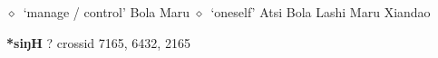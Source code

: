 \begin{list}{}{\leftmargin=1.5em \itemindent=-1.5em}
\hspace{1ex}
         $\diamond$~`manage / control'
         Bola 
\hspace{1ex}
         Maru 
\hspace{1ex}
         $\diamond$~`oneself'
         Atsi 
\hspace{1ex}
         Bola 
\hspace{1ex}
         Lashi 
\hspace{1ex}
         Maru 
\hspace{1ex}
         Xiandao 
  \end{list}
\item
\textbf{*siŋH}
?
  {\tiny crossid 7165, 6432, 2165}
